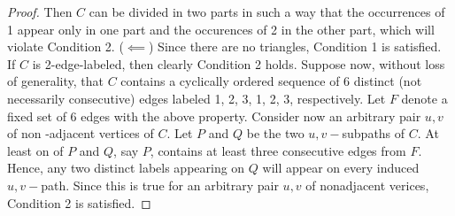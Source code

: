 \documentclass[12pt,a4paper,titlepage,openany]{report}
\begin{document}
\begin{proof}
Then $C$ can be divided in two parts in such a way that the occurrences of 1 appear only in one part and the occurences of 2 in the other part, which will violate Condition 2.\newline
($\impliedby$) Since there are no triangles, Condition 1 is satisfied. \newline
If $C$ is 2-edge-labeled, then clearly Condition 2 holds.\newline
Suppose now, without loss of generality, that $C$ contains a cyclically ordered sequence of 6 distinct (not necessarily consecutive) edges labeled 1, 2, 3, 1, 2, 3, respectively. Let $F$ denote a fixed set of 6 edges with the above property. Consider now an arbitrary pair $u,v$ of non -adjacent vertices of $C$. Let $P$ and $Q$ be the two $u,v-$subpaths of $C$. At least on of $P$ and $Q$, say $P$, contains at least three consecutive edges from $F$. Hence, any two distinct labels appearing on $Q$ will appear on every induced $u,v-$path. Since this is true for an arbitrary pair $u,v$ of nonadjacent verices, Condition 2 is satisfied.


\end{proof}
\end{document}
